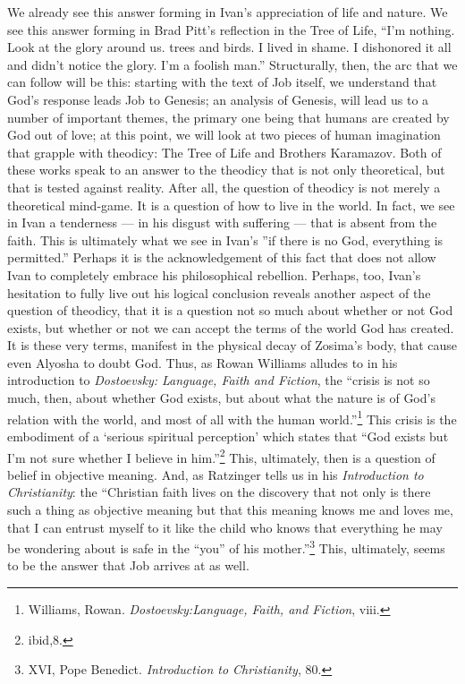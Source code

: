We already see this answer forming in Ivan's appreciation of life and nature. We see this answer forming in Brad Pitt's reflection in the Tree of Life, ``I'm nothing. Look at the glory around us. trees and birds. I lived in shame. I dishonored it all and didn't notice the glory. I'm a foolish man.'' Structurally, then, the arc that we can follow will be this: starting with the text of Job itself, we understand that God's response leads Job to Genesis; an analysis of Genesis, will lead us to a number of important themes, the primary one being that humans are created by God out of love; at this point, we will look at two pieces of human imagination that grapple with theodicy: The Tree of Life and Brothers Karamazov. Both of these works speak to an answer to the theodicy that is not only theoretical, but that is tested against reality. After all, the question of theodicy is not merely a theoretical mind-game. It is a question of how to live in the world. In fact, we see in Ivan a tenderness --- in his disgust with suffering --- that is absent from the faith. This is ultimately what we see in Ivan's ''if there is no God, everything is permitted.'' Perhaps it is the acknowledgement of this fact that does not allow Ivan to completely embrace his philosophical rebellion. Perhaps, too, Ivan's hesitation to fully live out his logical conclusion reveals another aspect of the question of theodicy, that it is a question not so much about whether or not God exists, but whether or not we can accept the terms of the world God has created. It is these very terms, manifest in the physical decay of Zosima's body, that cause even Alyosha to doubt God. Thus, as Rowan Williams alludes to in his introduction to \emph{Dostoevsky: Language, Faith and Fiction}, the ``crisis is not so much, then, about whether God exists, but about what the nature is of God's relation with the world, and most of all with the human world.''\footnote{Williams, Rowan. \emph{Dostoevsky:Language, Faith, and Fiction}, viii.} This crisis is the embodiment of a `serious spiritual perception' which states that ``God exists but I'm not sure whether I believe in him.''\footnote{ibid,8.}
This, ultimately, then is a question of belief in objective meaning. And, as Ratzinger tells us in his \emph{Introduction to Christianity}: the ``Christian faith lives on the discovery that not only is there such a thing as objective meaning but that this meaning knows me and loves me, that I can entrust myself to it like the child who knows that everything he may be wondering about is safe in the ``you'' of his mother.''\footnote{XVI, Pope Benedict. \emph{Introduction to Christianity}, 80.} This, ultimately, seems to be the answer that Job arrives at as well.

